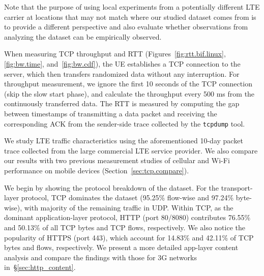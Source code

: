 Note that the purpose of using local experiments from a potentially different LTE carrier at locations that may not match where our studied dataset comes from is to provide a different perspective and also evaluate whether observations from analyzing the dataset can be empirically observed.

When measuring TCP throughput and RTT (Figures~\ref{fig:rtt.bif.linux}, \ref{fig:bw.time}, and~\ref{fig:bw.cdf}), the UE establishes a TCP connection to the server, which then transfers randomized data without any interruption.
For throughput measurement, we ignore the first 10 seconds of the TCP connection (skip the slow start phase), and calculate the throughput every 500 ms from the continuously transferred data. The RTT is measured by computing the gap between timestamps of transmitting a data packet and receiving the corresponding ACK from the sender-side trace collected by the \texttt{tcpdump} tool.




\label{sec:tcp.char}


We study LTE traffic characteristics using the aforementioned 10-day packet trace collected from the large commercial LTE service provider. We also compare our results with two previous measurement studies of cellular and Wi-Fi performance on mobile devices (Section~\ref{sec:tcp.compare}).


\label{subsec:char_flow}

We begin by showing the protocol breakdown of the dataset. For the transport-layer protocol, TCP dominates the dataset (95.25\% flow-wise and 97.24\% byte-wise), with majority of the remaining traffic in UDP. Within TCP, as the dominant application-layer protocol, HTTP (port 80/8080) contributes 76.55\% and 50.13\% of all TCP bytes and TCP flows, respectively. We also notice the popularity of HTTPS (port 443), which account for 14.83\% and 42.11\% of TCP bytes and flows, respectively. We present a more detailed app-layer content analysis and compare the findings with those for 3G networks in~\S\ref{sec:http_content}.

